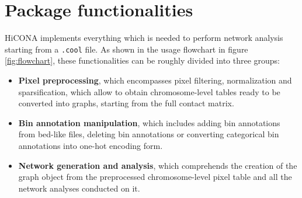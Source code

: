 \section{Package functionalities}
HiCONA implements everything which is needed to perform network analysis starting from a \texttt{.cool} file. As shown in the usage flowchart in figure \ref{fig:flowchart}, these functionalities can be roughly divided into three groups:
\begin{itemize}\tightlist
  \item \textbf{Pixel preprocessing}, which encompasses pixel filtering, normalization and sparsification, which allow to obtain chromosome-level tables ready to be converted into graphs, starting from the full contact matrix.
  \item \textbf{Bin annotation manipulation}, which includes adding bin annotations from bed-like files, deleting bin annotations or converting categorical bin annotations into one-hot encoding form.
  \item \textbf{Network generation and analysis}, which comprehends the creation of the graph object from the preprocessed chromosome-level pixel table and all the network analyses conducted on it.
\end{itemize} 


